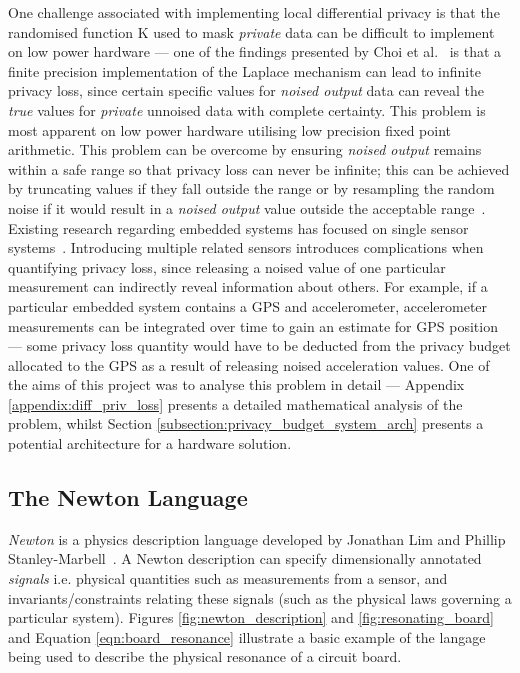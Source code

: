 \documentclass[12pt]{article}
\begin{document}
    One challenge associated with implementing local differential privacy is that the randomised function K used to mask \textit{private} data can be difficult to implement on low power hardware --- one of the findings presented by Choi et al.~\cite{Choi2018GuaranteeingLD} is that a finite precision implementation of the Laplace mechanism can lead to infinite privacy loss, since certain specific values for \textit{noised output} data can reveal the \textit{true} values for \textit{private} unnoised data with complete certainty. This problem is most apparent on low power hardware utilising low precision fixed point arithmetic. This problem can be overcome by ensuring \textit{noised output} remains within a safe range so that privacy loss can never be infinite; this can be achieved by truncating values if they fall outside the range or by resampling the random noise if it would result in a \textit{noised output} value outside the acceptable range~\cite{Choi2018GuaranteeingLD}.\\

    Existing research regarding embedded systems has focused on single sensor systems~\cite{Choi2018GuaranteeingLD}. Introducing multiple related sensors introduces complications when quantifying privacy loss, since releasing a noised value of one particular measurement can indirectly reveal information about others. For example, if a particular embedded system contains a GPS and accelerometer, accelerometer measurements can be integrated over time to gain an estimate for GPS position --- some privacy loss quantity would have to be deducted from the privacy budget allocated to the GPS as a result of releasing noised acceleration values. One of the aims of this project was to analyse this problem in detail --- Appendix \ref{appendix:diff_priv_loss} presents a detailed mathematical analysis of the problem, whilst Section \ref{subsection:privacy_budget_system_arch} presents a potential architecture for a hardware solution.

  \subsection{The Newton Language}
    \textit{Newton} is a physics description language developed by Jonathan Lim and Phillip Stanley-Marbell~\cite{Newton}. A Newton description can specify dimensionally annotated \textit{signals} i.e. physical quantities such as measurements from a sensor, and invariants/constraints relating these signals (such as the physical laws governing a particular system). Figures \ref{fig:newton_description} and \ref{fig:resonating_board} and Equation \ref{eqn:board_resonance} illustrate a basic example of the langage being used to describe the physical resonance of a circuit board.
\end{document}
